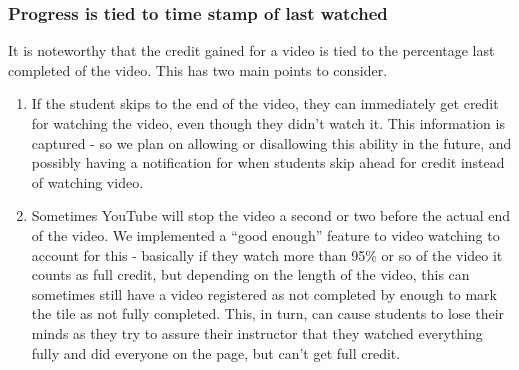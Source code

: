 \documentclass{ximera}
\begin{document}
        \subsubsection*{Progress is tied to time stamp of last watched}
            It is noteworthy that the credit gained for a video is tied to the percentage last completed of the video. This has two main points to consider.
            \begin{enumerate}
                \item If the student skips to the end of the video, they can immediately get credit for watching the video, even though they didn't watch it. This information is captured - so we plan on allowing or disallowing this ability in the future, and possibly having a notification for when students skip ahead for credit instead of watching video.
                \item Sometimes YouTube will stop the video a second or two before the actual end of the video. We implemented a ``good enough'' feature to video watching to account for this - basically if they watch more than 95\% or so of the video it counts as full credit, but depending on the length of the video, this can sometimes still have a video registered as not completed by enough to mark the tile as not fully completed. This, in turn, can cause students to lose their minds as they try to assure their instructor that they watched everything fully and did everyone on the page, but can't get full credit.
            
            \end{enumerate}
\end{document}
